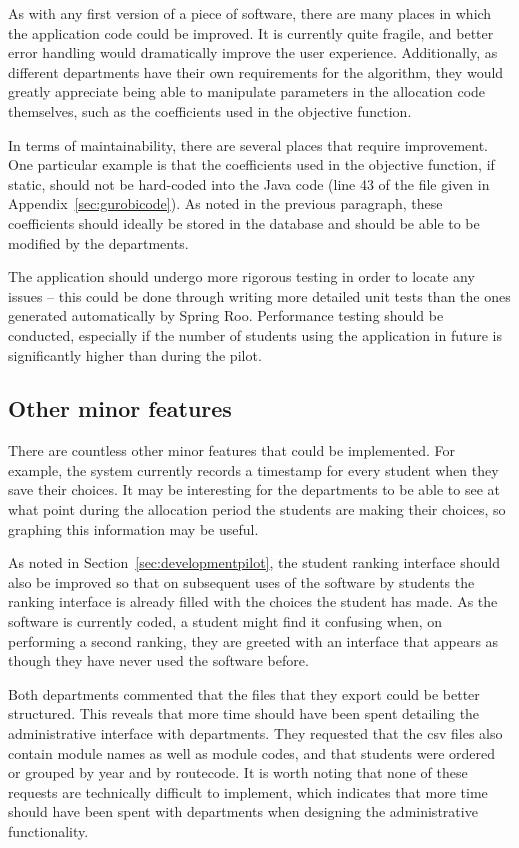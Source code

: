 As with any first version of a piece of software, there are many places in
which the application code could be improved. It is currently quite fragile,
and better error handling would dramatically improve the user experience.
Additionally, as different departments have their own requirements for the
algorithm, they would greatly appreciate being able to manipulate parameters
in the allocation code themselves, such as the coefficients used in the
objective function.

In terms of maintainability, there are several places that require
improvement. One particular example is that the coefficients used in the
objective function, if static, should not be hard-coded into the Java code
(line 43 of the file given in Appendix~\ref{sec:gurobicode}). As noted in the
previous paragraph, these coefficients should ideally be stored in the
database and should be able to be modified by the departments.

The application should undergo more rigorous testing in order to locate any
issues -- this could be done through writing more detailed unit tests than the
ones generated automatically by Spring Roo. Performance testing should be
conducted, especially if the number of students using the application in
future is significantly higher than during the pilot.

\subsection{Other minor features}

There are countless other minor features that could be implemented. For
example, the system currently records a timestamp for every student when they
save their choices. It may be interesting for the departments to be able to
see at what point during the allocation period the students are making their
choices, so graphing this information may be useful.

As noted in Section~\ref{sec:developmentpilot}, the student ranking interface
should also be improved so that on subsequent uses of the software by students
the ranking interface is already filled with the choices the student has made.
As the software is currently coded, a student might find it confusing when, on
performing a second ranking, they are greeted with an interface that appears
as though they have never used the software before.

Both departments commented that the files that they export could be better
structured. This reveals that more time should have been spent detailing the
administrative interface with departments. They requested that the \gls{csv}
files also contain module names as well as module codes, and that students
were ordered or grouped by year and by \gls{routecode}. It is worth noting
that none of these requests are technically difficult to implement, which
indicates that more time should have been spent with departments when
designing the administrative functionality.
